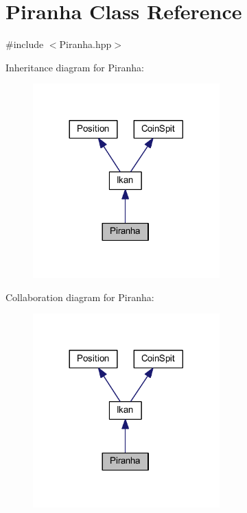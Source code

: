 \hypertarget{class_piranha}{}\section{Piranha Class Reference}
\label{class_piranha}


{\ttfamily \#include $<$Piranha.\+hpp$>$}



Inheritance diagram for Piranha\+:\nopagebreak
\begin{figure}[H]
\begin{center}
\leavevmode
\includegraphics[width=204pt]{class_piranha__inherit__graph}
\end{center}
\end{figure}


Collaboration diagram for Piranha\+:\nopagebreak
\begin{figure}[H]
\begin{center}
\leavevmode
\includegraphics[width=204pt]{class_piranha__coll__graph}
\end{center}
\end{figure}
